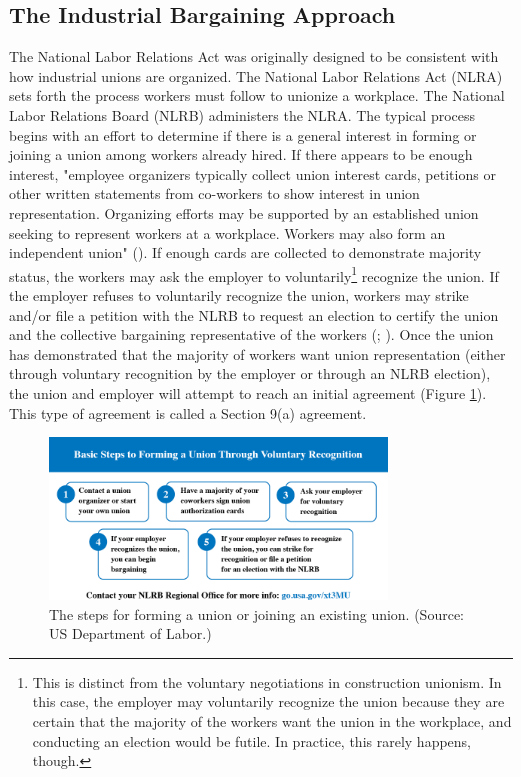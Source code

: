 \documentclass[12pt]{article}
\newcommand{\imageWidth}{0.8\textwidth}
\begin{document}
\subsection{The Industrial Bargaining Approach}

The National Labor Relations Act was originally designed to be consistent with how industrial unions are organized. The National Labor Relations Act (NLRA) sets forth the process workers must follow to unionize a workplace. The National Labor Relations Board (NLRB) administers the NLRA. The typical process begins with an effort to determine if there is a general interest in forming or joining a union among workers already hired. If there appears to be enough interest, "employee organizers typically collect union interest cards, petitions or other written statements from co-workers to show interest in union representation. Organizing efforts may be supported by an established union seeking to represent workers at a workplace. Workers may also form an independent union" (\cite["How can I form a union?"]{dolWORKCenterUnions}). If enough cards are collected to demonstrate majority status, the workers may ask the employer to voluntarily\footnote{This is distinct from the voluntary negotiations in construction unionism. In this case, the employer may voluntarily recognize the union because they are certain that the majority of the workers want the union in the workplace, and conducting an election would be futile. In practice, this rarely happens, though.}  recognize the union. If the employer refuses to voluntarily recognize the union, workers may strike and/or file a petition with the NLRB to request an election to certify the union and the collective bargaining representative of the workers (\cite["How can I form a union?"]{dolWORKCenterUnions}; \cite{NLRBProcessNational}). Once the union has demonstrated that the majority of workers want union representation (either through voluntary recognition by the employer or through an NLRB election), the union and employer will attempt to reach an initial agreement (Figure \ref{fig:DOL}). This type of agreement is called a Section 9(a) agreement.

\begin{figure}[ht]
  \centering
  \includegraphics[width=\imageWidth]{images/DOL}
  \captionsetup{justification=centering, singlelinecheck=false, margin=2cm}
  \caption[Forming a Union]{The steps for forming a union or joining an existing union. (Source: US Department of Labor.)}
  \label{fig:DOL}
\end{figure}
\end{document}
